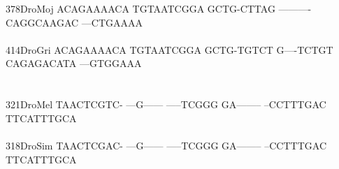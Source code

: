 \documentclass[11pt,twoside,reqno,a4paper]{article}
\begin{document}
{378\hspace*{1\charwidth}DroMoj	ACAGAAAACA	TGTAATCGGA	GCTG-CTTAG	----------	CAGGCAAGAC	---CTGAAAA	\\
\hspace*{4\charwidth}\hspace*{7\charwidth}\hspace*{1\charwidth}\hspace*{1\charwidth}\hspace*{1\charwidth}\hspace*{1\charwidth}\hspace*{1\charwidth}\hspace*{1\charwidth}\\
414\hspace*{1\charwidth}DroGri	ACAGAAAACA	TGTAATCGGA	GCTG-TGTCT	G----TCTGT	CAGAGACATA	---GTGGAAA	\\
\hspace*{4\charwidth}\hspace*{7\charwidth}\hspace*{1\charwidth}\hspace*{1\charwidth}\hspace*{1\charwidth}\hspace*{1\charwidth}\hspace*{1\charwidth}\hspace*{1\charwidth}\\
\\
321\hspace*{1\charwidth}DroMel	TAACTCGTC-	---G------	-----TCGGG	GA--------	--CCTTTGAC	TTCATTTGCA	\\
\hspace*{4\charwidth}\hspace*{7\charwidth}\hspace*{1\charwidth}\hspace*{1\charwidth}\hspace*{1\charwidth}\hspace*{1\charwidth}\hspace*{1\charwidth}\hspace*{1\charwidth}\\
318\hspace*{1\charwidth}DroSim	TAACTCGAC-	---G------	-----TCGGG	GA--------	--CCTTTGAC	TTCATTTGCA	\\
\hspace*{4\charwidth}\hspace*{7\charwidth}\hspace*{1\charwidth}\hspace*{1\charwidth}\hspace*{1\charwidth}\hspace*{1\charwidth}\hspace*{1\charwidth}\hspace*{1\charwidth}\\
}
\end{document}
